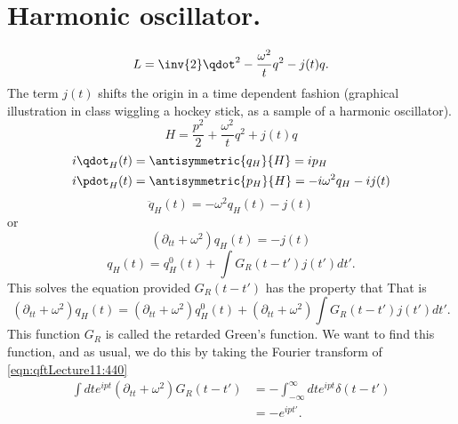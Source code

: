 %
%
\section{Harmonic oscillator.}
\begin{equation}\label{eqn:qftLecture11:320}
L = \inv{2} \qdot^2 - \frac{\omega^2}{t} q^2 - j(t) q.
\end{equation}
The term \( j(t) \) shifts the origin in a time dependent fashion (graphical illustration in class wiggling a hockey stick, as a sample of a harmonic oscillator).
\begin{equation}\label{eqn:qftLecture11:340}
H = \frac{p^2}{2} + \frac{\omega^2}{t} q^2 + j(t) q
\end{equation}
\begin{equation}\label{eqn:qftLecture11:360}
\begin{aligned}
i \qdot_H(t) &= \antisymmetric{q_H}{H} = i p_H \\
i \pdot_H(t) &= \antisymmetric{p_H}{H} = -i \omega^2 q_H - i j(t)
\end{aligned}
\end{equation}
\begin{equation}\label{eqn:qftLecture11:380}
\ddot{q}_H(t) = - \omega^2 q_H(t) - j(t)
\end{equation}
or
\begin{equation}\label{eqn:qftLecture11:400}
(\partial_{tt} + \omega^2 ) q_H(t) = - j(t)
\end{equation}
\begin{equation}\label{eqn:qftLecture11:420}
q_H(t) = q_H^0( t ) +
\int G_R(t - t') j(t') dt'.
\end{equation}
This solves the equation provided \( G_R(t - t') \) has the property that
That is
\begin{equation}\label{eqn:qftLecture11:460}
(\partial_{tt} + \omega^2)
q_H(t) =
(\partial_{tt} + \omega^2)
q_H^0( t )
+
(\partial_{tt} + \omega^2)
\int G_R(t - t') j(t') dt'.
\end{equation}
This function \( G_R \) is called the retarded Green's function.  We want to find this function, and as usual, we do this by taking the Fourier transform of \cref{eqn:qftLecture11:440}
\begin{equation}\label{eqn:qftLecture11:480}
\begin{aligned}
\int dt e^{i p t}
(\partial_{tt} + \omega^2) G_R(t - t')
&=
-\int_{-\infty}^\infty dt e^{i p t}
\delta(t - t') \\
&= - e^{i p t'}.
\end{aligned}
\end{equation}

